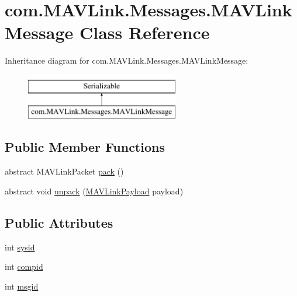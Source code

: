 \hypertarget{classcom_1_1MAVLink_1_1Messages_1_1MAVLinkMessage}{}\section{com.\+M\+A\+V\+Link.\+Messages.\+M\+A\+V\+Link\+Message Class Reference}
\label{classcom_1_1MAVLink_1_1Messages_1_1MAVLinkMessage}
Inheritance diagram for com.\+M\+A\+V\+Link.\+Messages.\+M\+A\+V\+Link\+Message\+:\begin{figure}[H]
\begin{center}
\leavevmode
\includegraphics[height=2.000000cm]{classcom_1_1MAVLink_1_1Messages_1_1MAVLinkMessage}
\end{center}
\end{figure}
\subsection*{Public Member Functions}
\begin{DoxyCompactItemize}
\item 
abstract M\+A\+V\+Link\+Packet \mbox{\hyperlink{classcom_1_1MAVLink_1_1Messages_1_1MAVLinkMessage_af25705beb4ae8d8ad2f274202ed4fe6e}{pack}} ()
\item 
abstract void \mbox{\hyperlink{classcom_1_1MAVLink_1_1Messages_1_1MAVLinkMessage_a323793ff4d45acc7c8e5430d92265156}{unpack}} (\mbox{\hyperlink{classcom_1_1MAVLink_1_1Messages_1_1MAVLinkPayload}{M\+A\+V\+Link\+Payload}} payload)
\end{DoxyCompactItemize}
\subsection*{Public Attributes}
\begin{DoxyCompactItemize}
\item 
int \mbox{\hyperlink{classcom_1_1MAVLink_1_1Messages_1_1MAVLinkMessage_addeab3d19c1a864d569978302031792a}{sysid}}
\item 
int \mbox{\hyperlink{classcom_1_1MAVLink_1_1Messages_1_1MAVLinkMessage_a3cc56234000b2fa3e1cd488211e611a0}{compid}}
\item 
int \mbox{\hyperlink{classcom_1_1MAVLink_1_1Messages_1_1MAVLinkMessage_a552595198ab3909eacacfe1a95e10325}{msgid}}
\end{DoxyCompactItemize}


